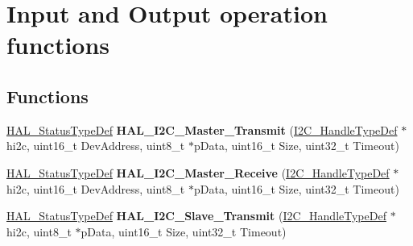\hypertarget{group___i2_c___exported___functions___group2}{}\section{Input and Output operation functions}
\label{group___i2_c___exported___functions___group2}
\subsection*{Functions}
\begin{DoxyCompactItemize}
\item 
\mbox{\label{group___i2_c___exported___functions___group2_ga9440a306e25c7bd038cfa8619ec9a830}} 
\mbox{\hyperlink{stm32f7xx__hal__def_8h_a63c0679d1cb8b8c684fbb0632743478f}{H\+A\+L\+\_\+\+Status\+Type\+Def}} {\bfseries H\+A\+L\+\_\+\+I2\+C\+\_\+\+Master\+\_\+\+Transmit} (\mbox{\hyperlink{struct_____i2_c___handle_type_def}{I2\+C\+\_\+\+Handle\+Type\+Def}} $\ast$hi2c, uint16\+\_\+t Dev\+Address, uint8\+\_\+t $\ast$p\+Data, uint16\+\_\+t Size, uint32\+\_\+t Timeout)
\item 
\mbox{\label{group___i2_c___exported___functions___group2_ga6b3cef8c309e88ed6d3b8deba149aac9}} 
\mbox{\hyperlink{stm32f7xx__hal__def_8h_a63c0679d1cb8b8c684fbb0632743478f}{H\+A\+L\+\_\+\+Status\+Type\+Def}} {\bfseries H\+A\+L\+\_\+\+I2\+C\+\_\+\+Master\+\_\+\+Receive} (\mbox{\hyperlink{struct_____i2_c___handle_type_def}{I2\+C\+\_\+\+Handle\+Type\+Def}} $\ast$hi2c, uint16\+\_\+t Dev\+Address, uint8\+\_\+t $\ast$p\+Data, uint16\+\_\+t Size, uint32\+\_\+t Timeout)
\item 
\mbox{\label{group___i2_c___exported___functions___group2_ga9128c5f01406d0da061a2bce00b6866e}} 
\mbox{\hyperlink{stm32f7xx__hal__def_8h_a63c0679d1cb8b8c684fbb0632743478f}{H\+A\+L\+\_\+\+Status\+Type\+Def}} {\bfseries H\+A\+L\+\_\+\+I2\+C\+\_\+\+Slave\+\_\+\+Transmit} (\mbox{\hyperlink{struct_____i2_c___handle_type_def}{I2\+C\+\_\+\+Handle\+Type\+Def}} $\ast$hi2c, uint8\+\_\+t $\ast$p\+Data, uint16\+\_\+t Size, uint32\+\_\+t Timeout)
\item 
\mbox{\label{group___i2_c___exported___functions___group2_ga92b445a5ca4f5b8195f1c10ebdc41687}} 

\end{DoxyCompactItemize}
